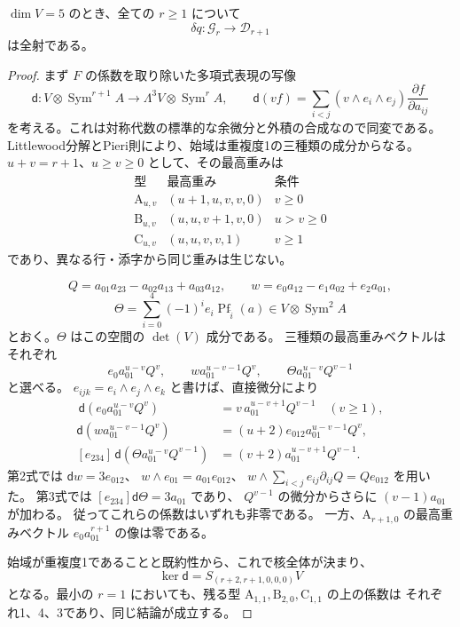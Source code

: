 \begin{proposition}[普遍共変量上のPfaffian微分は全次数で全射]
\label{prop:v12-uniform-pfaffian-surjectivity}
$\dim V=5$ のとき、全ての $r\ge1$ について
\[
 \delta q:\mathcal G_r\longrightarrow\mathcal D_{r+1}
\]
は全射である。
\end{proposition}
\begin{proof}
まず $F$ の係数を取り除いた多項式表現の写像
\[
 \mathsf d:V\otimes\operatorname{Sym}^{r+1}A
       \longrightarrow\Lambda^3V\otimes\operatorname{Sym}^r A,
 \qquad
 \mathsf d(vf)=\sum_{i<j}(v\wedge e_i\wedge e_j)
                   \frac{\partial f}{\partial a_{ij}}
\]
を考える。これは対称代数の標準的な余微分と外積の合成なので同変である。
Littlewood分解とPieri則により、始域は重複度1の三種類の成分からなる。
$u+v=r+1$、$u\ge v\ge0$ として、その最高重みは
\[
\begin{array}{c|c|c}
 \text{型}&\text{最高重み}&\text{条件}\\\hline
 \mathrm A_{u,v}&(u+1,u,v,v,0)&v\ge0\\
 \mathrm B_{u,v}&(u,u,v+1,v,0)&u>v\ge0\\
 \mathrm C_{u,v}&(u,u,v,v,1)&v\ge1
\end{array}
\]
であり、異なる行・添字から同じ重みは生じない。

\[
 Q=a_{01}a_{23}-a_{02}a_{13}+a_{03}a_{12},\qquad
 w=e_0a_{12}-e_1a_{02}+e_2a_{01},
\]
\[
 \Theta=\sum_{i=0}^4(-1)^i e_i\operatorname{Pf}_{\widehat i}(a)
       \in V\otimes\operatorname{Sym}^2A
\]
とおく。$\Theta$ はこの空間の $\det(V)$ 成分である。
三種類の最高重みベクトルはそれぞれ
\[
 e_0a_{01}^{u-v}Q^v,\qquad
 wa_{01}^{u-v-1}Q^v,\qquad
 \Theta a_{01}^{u-v}Q^{v-1}
\]
と選べる。
$e_{ijk}=e_i\wedge e_j\wedge e_k$ と書けば、直接微分により
\begin{align*}
 [e_{023}]\,\mathsf d(e_0a_{01}^{u-v}Q^v)
  &=v\,a_{01}^{u-v+1}Q^{v-1}\quad(v\ge1),\\
 \mathsf d(wa_{01}^{u-v-1}Q^v)
  &=(u+2)e_{012}a_{01}^{u-v-1}Q^v,\\
 [e_{234}]\,\mathsf d(\Theta a_{01}^{u-v}Q^{v-1})
  &=(v+2)a_{01}^{u-v+1}Q^{v-1}.
\end{align*}
第2式では $\mathsf dw=3e_{012}$、
$w\wedge e_{01}=a_{01}e_{012}$、
$w\wedge\sum_{i<j}e_{ij}\partial_{ij}Q=Qe_{012}$ を用いた。
第3式では $[e_{234}]\mathsf d\Theta=3a_{01}$ であり、
$Q^{v-1}$ の微分からさらに $(v-1)a_{01}$ が加わる。
従ってこれらの係数はいずれも非零である。
一方、$\mathrm A_{r+1,0}$ の最高重みベクトル
$e_0a_{01}^{r+1}$ の像は零である。

始域が重複度1であることと既約性から、これで核全体が決まり、
\begin{equation}\label{eq:v12-uniform-pfaffian-kernel}
 \ker\mathsf d=S_{(r+2,r+1,0,0,0)}V
\end{equation}
となる。最小の $r=1$ においても、残る型
$\mathrm A_{1,1},\mathrm B_{2,0},\mathrm C_{1,1}$ の上の係数は
 それぞれ1、4、3であり、同じ結論が成立する。


\end{proof}
